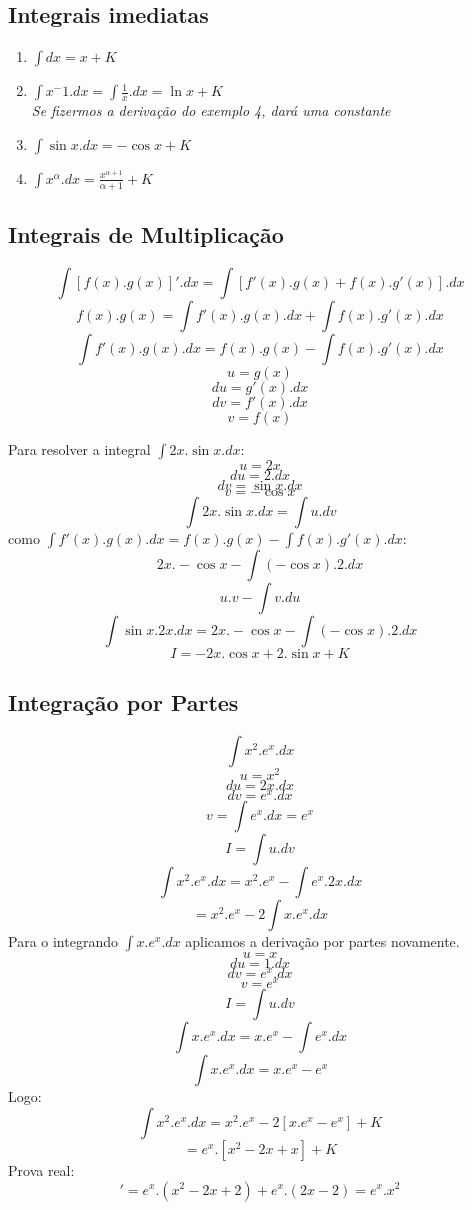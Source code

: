 \documentclass{article}
\begin{document}
		\subsection{Integrais imediatas}
			\begin{enumerate}
				\item $\int dx = x+K$
				\item $\int x^-1.dx = \int \frac{1}{x}.dx = \ln x+K$ \\ \textit{Se fizermos a derivação do exemplo 4, dará uma constante}
				\item $\int \sin x . dx = -\cos x +K$
				\item $\int x^\alpha .dx = \frac{x^{\alpha+1}}{\alpha+1}+K$
			\end{enumerate}
		\subsection{Integrais de Multiplicação}
			$$\int [f(x).g(x)]'.dx = \int[f'(x).g(x)+f(x).g'(x)].dx$$
			$$f(x).g(x) = \int f'(x).g(x).dx + \int f(x).g'(x).dx$$
			$$\int f'(x).g(x).dx = f(x).g(x) - \int f(x).g'(x).dx$$
				$$u = g(x)$$
				$$du = g'(x).dx$$
				$$dv = f'(x).dx$$			
				$$v = f(x)$$
			
			
			Para resolver a integral $\int 2x. \sin x .dx$:\\
				$$u = 2x$$
				$$du = 2.dx$$
				$$dv = \sin x.dx$$
				$$v = -\cos x$$
			$$\int 2x. \sin x . dx = \int u . dv$$
			como $\int f'(x).g(x).dx = f(x).g(x)-\int f(x).g'(x).dx$:
			$$2x. - \cos x - \int ( - \cos x ).2.dx$$
			$$u.v- \int v.du$$
			$$\int \sin x.2x.dx = 2x. - \cos x - \int (- \cos x).2.dx$$
			$$I = -2x.\cos x +2.\sin x + K$$
			
		\subsection{Integração por Partes}
			$$\int x^2.e^x.dx$$
			$$u = x^2$$
			$$du = 2x.dx$$
			$$dv = e^x.dx$$
			$$v = \int e^x.dx = e^x$$
			$$I=\int u.dv$$
			$$\int x^2.e^x.dx = x^2.e^x-\int e^x.2x.dx$$
			$$=x^2.e^x-2\int x.e^x.dx$$
			Para o integrando $\int x.e^x.dx$ aplicamos a derivação por partes novamente.
			$$u = x$$
			$$du = 1.dx$$
			$$dv = e^x.dx$$
			$$v = e^x$$
			$$I = \int u . dv$$
			$$\int x.e^x.dx = x.e^x-\int e^x.dx$$
			$$\int x.e^x.dx = x.e^x-e^x$$
			Logo:
			$$\int x^2.e^x.dx = x^2.e^x-2[x.e^x-e^x]+K$$
			$$= e^x.[x^2-2x+x]+K$$
			Prova real:
			\begin{equation}
				[e^x.(x^2-2x+x)]'= e^x.(x^2-2x+2)+e^x.(2x-2)
				=e^x.x^2
			\end{equation}
			
\end{document}
